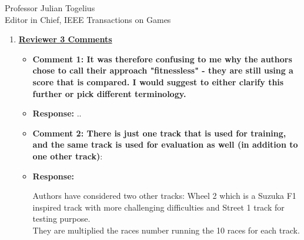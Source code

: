 \documentclass[10pt]{letter} %
\begin{document}
\begin{letter}{Professor Julian Togelius \\ Editor in Chief, IEEE Transactions on Games}
\begin{enumerate}
\begin{itemize}
		{\em Thus, in this paper we are testing the best approaches we have found all together in an algorithm, considering a kind of fitnessless selection, which we have called \textit{Grand Prix Selection} (GPS). Although this selection uses a score that could be assimilated to a fitness, it's actually an extension of a 	tournament selection policy since it creates tournaments of several individuals, and ``scores'' them according to how they fare in these races. This is not actually a fitness, since it's not intrinsic to
		the individual. It's equivalent to, in a $n$-tournament selection that is repeated several times, giving a score of $n$ to the first, $n-1$ to the second, and then using this for selection. That score is, thus, not a fitness but actually a way of keeping track of the position of the individual in the different tournaments it's participated; since, in this context, we have no way of evaluating (=assigning a fitness) to a controller but only a way to compare	them, we call this approach {\em fitnessless}, as it was called, for instance, in {\sc jaskowski2008winning}.}
		
		\item {\bf  Comment 2: Language errors :} 
			\item {\bf Response:} Revisited
	                \end{itemize}
\item {\bf \underline{ Reviewer 3 Comments}}\\
	\begin{itemize}
	\item {\bf  Comment 1: It was therefore confusing to me why the authors chose to call their approach "fitnessless" - they are still using a score that is compared. I would suggest to either clarify this further or pick different terminology.}\\
	\item {\bf Response:}
..
		\item {\bf  Comment 2:	There is just one track that is used for training, and the same track is used for evaluation as well (in addition to one other track)}:\\
		\item {\bf Response:}
				
		Authors have considered two other tracks: Wheel 2 which is a Suzuka F1 inspired track with more challenging difficulties and Street 1 track for testing purpose.\\
		They are multiplied the races number running the  10 races for each track.


\end{itemize}
\end{enumerate}
\end{letter}
\end{document}
